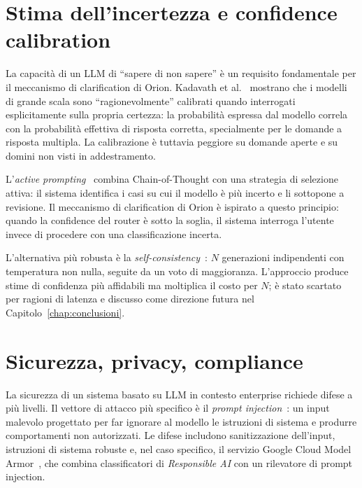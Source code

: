 \section{Stima dell'incertezza e confidence calibration}
\label{sec:bg-confidence}

La capacità di un LLM di ``sapere di non sapere'' è un requisito fondamentale per il meccanismo di clarification di Orion. 
Kadavath et al.~\cite{kadavath2022knowsknows} mostrano che i modelli di grande scala sono ``ragionevolmente'' calibrati quando interrogati esplicitamente sulla propria certezza: 
la probabilità espressa dal modello correla con la probabilità effettiva di risposta corretta, specialmente per le domande a risposta multipla. 
La calibrazione è tuttavia peggiore su domande aperte e su domini non visti in addestramento.

L'\emph{active prompting}~\cite{diao2023activeprompting} combina Chain-of-Thought con una strategia di selezione attiva: 
il sistema identifica i casi su cui il modello è più incerto e li sottopone a revisione. 
Il meccanismo di clarification di Orion è ispirato a questo principio: quando la confidence del router è sotto la soglia, 
il sistema interroga l'utente invece di procedere con una classificazione incerta.

L'alternativa più robusta è la \emph{self-consistency}~\cite{wang2022selfconsistency}: $N$ generazioni indipendenti 
con temperatura non nulla, seguite da un voto di maggioranza. 
L'approccio produce stime di confidenza più affidabili ma moltiplica il costo per $N$; 
è stato scartato per ragioni di latenza e discusso come direzione futura nel Capitolo~\ref{chap:conclusioni}.

\section{Sicurezza, privacy, compliance}
\label{sec:bg-security}

La sicurezza di un sistema basato su LLM in contesto enterprise richiede difese a più livelli. 
Il vettore di attacco più specifico è il \emph{prompt injection}~\cite{perez2022promptinjection}: 
un input malevolo progettato per far ignorare al modello le istruzioni di sistema e produrre comportamenti non autorizzati. 
Le difese includono sanitizzazione dell'input, istruzioni di sistema robuste e, nel caso specifico, il servizio Google Cloud Model Armor~\cite{gcp_modelarmor}, 
che combina classificatori di \emph{Responsible AI} con un rilevatore di prompt injection.


